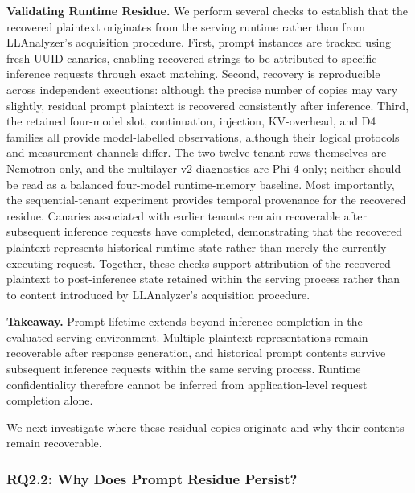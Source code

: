 \documentclass[journal,tifs]{IEEEtran}
\begin{document}

{\bf Validating Runtime Residue.} We perform several checks to establish that the recovered plaintext
originates from the serving runtime rather than from LLAnalyzer's
acquisition procedure. First, prompt instances are tracked using fresh UUID canaries, enabling
recovered strings to be attributed to specific inference requests
through exact matching. Second, recovery is reproducible across
independent executions: although the precise number of copies may vary
slightly, residual prompt plaintext is recovered consistently after
inference. Third, the retained four-model slot, continuation, injection,
KV-overhead, and D4 families all provide model-labelled observations,
although their logical protocols and measurement channels differ. The two
twelve-tenant rows themselves are Nemotron-only, and the multilayer-v2
diagnostics are Phi-4-only; neither should be read as a balanced four-model
runtime-memory baseline. Most importantly, the sequential-tenant experiment provides temporal
provenance for the recovered residue. Canaries associated with earlier
tenants remain recoverable after subsequent inference requests have
completed, demonstrating that the recovered plaintext represents
historical runtime state rather than merely the currently executing
request. Together, these checks support attribution of the recovered plaintext
to post-inference state retained within the serving process rather than
to content introduced by LLAnalyzer's acquisition procedure.


{\bf Takeaway.}
Prompt lifetime extends beyond inference completion in the evaluated
serving environment. Multiple plaintext representations remain
recoverable after response generation, and historical prompt contents
survive subsequent inference requests within the same serving process.
Runtime confidentiality therefore cannot be inferred from
application-level request completion alone.

We next investigate where these residual copies originate and why their
contents remain recoverable.

\subsubsection{RQ2.2: Why Does Prompt Residue Persist?}
\label{sec:rq2_mechanism}
\end{document}
